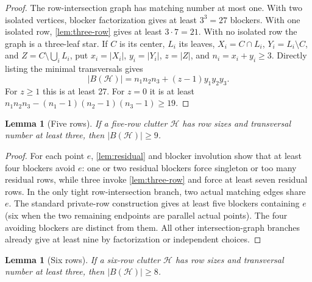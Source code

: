 \documentclass[11pt,a4paper]{article}
\newtheorem{lemma}[theorem]{Lemma}
\theoremstyle{definition}
\newcommand{\blocker}{B}
\begin{document}
\begin{proof}
The row-intersection graph has matching number at most one.  With two
isolated vertices, blocker factorization gives at least $3^3=27$ blockers.
With one isolated row, \cref{lem:three-row} gives at least $3\cdot7=21$.
With no isolated row the graph is a three-leaf star.  If $C$ is its center,
$L_i$ its leaves, $X_i=C\cap L_i$, $Y_i=L_i\setminus C$, and
$Z=C\setminus\bigcup_iL_i$, put $x_i=|X_i|$, $y_i=|Y_i|$,
$z=|Z|$, and $n_i=x_i+y_i\geq3$.  Directly listing the minimal
transversals gives
\[
 |\blocker(\mathcal H)|
 =n_1n_2n_3+(z-1)y_1y_2y_3.
\]
For $z\geq1$ this is at least 27.  For $z=0$ it is at least
$n_1n_2n_3-(n_1-1)(n_2-1)(n_3-1)\geq19$.
\end{proof}

\begin{lemma}[Five rows]
\label{lem:five-nine}
If a five-row clutter $\mathcal H$ has row sizes and transversal number at
least three, then $|\blocker(\mathcal H)|\geq9$.
\end{lemma}

\begin{proof}
For each point $e$, \cref{lem:residual} and blocker involution show that at
least four blockers avoid $e$: one or two residual blockers force singleton
or too many residual rows, while three invoke \cref{lem:three-row} and force
at least seven residual rows.  In the only tight row-intersection branch,
two actual matching edges share $e$.  The standard private-row construction
gives at least five blockers containing $e$ (six when the two remaining
endpoints are parallel actual points).  The four avoiding blockers are
distinct from them.  All other intersection-graph branches already give
at least nine by factorization or independent choices.
\end{proof}

\begin{lemma}[Six rows]
\label{lem:six-eight}
If a six-row clutter $\mathcal H$ has row sizes and transversal number at
least three, then $|\blocker(\mathcal H)|\geq8$.
\end{lemma}
\end{document}
